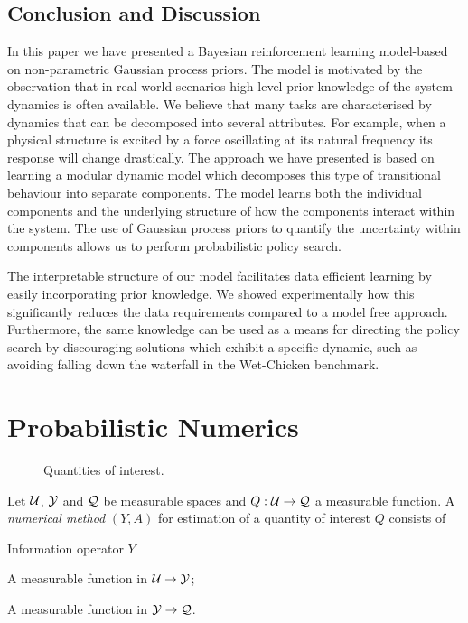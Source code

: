 \subsection{Conclusion and Discussion}
\label{sub:interpretable_reinforcement_learning:conclusion}
In this paper we have presented a Bayesian reinforcement learning model-based on non-parametric Gaussian process priors.
The model is motivated by the observation that in real world scenarios high-level prior knowledge of the system dynamics is often available.
We believe that many tasks are characterised by dynamics that can be decomposed into several attributes.
For example, when a physical structure is excited by a force oscillating at its natural frequency its response will change drastically.
The approach we have presented is based on learning a modular dynamic model which decomposes this type of transitional behaviour into separate components.
The model learns both the individual components and the underlying structure of how the components interact within the system.
The use of Gaussian process priors to quantify the uncertainty within components allows us to perform probabilistic policy search.

The interpretable structure of our model facilitates data efficient learning by easily incorporating prior knowledge.
We showed experimentally how this significantly reduces the data requirements compared to a model free approach.
Furthermore, the same knowledge can be used as a means for directing the policy search by discouraging solutions which exhibit a specific dynamic, such as avoiding falling down the waterfall in the Wet-Chicken benchmark.


\section{Probabilistic Numerics}
\label{sec:probabilistic_numerics:probabilistic_numerics}
\begin{figure}[t]
    \centering
    
    \caption[Quantities of interest]{
        Quantities of interest.
        \label{fig:probabilistic_numerics:quantities_of_interest}
    }
\end{figure}
\begin{definition}
    \label{def:probabilistic_numerics:numerical_method}
    Let $\mathcal{U}$, $\mathcal{Y}$ and $\mathcal{Q}$ be measurable spaces and $Q: \mathcal{U} \to \mathcal{Q}$ a measurable function.
    A \emph{numerical method} $(Y, A)$ for estimation of a quantity of interest $Q$ consists of
    \begin{labeling}{Information operator $Y$\quad}
        \item[Information operator $Y$] A measurable function in $\mathcal{U} \to \mathcal{Y}$;
        \item[Estimation operator $A$] A measurable function in $\mathcal{Y} \to \mathcal{Q}$.
    \end{labeling}
\end{definition}


